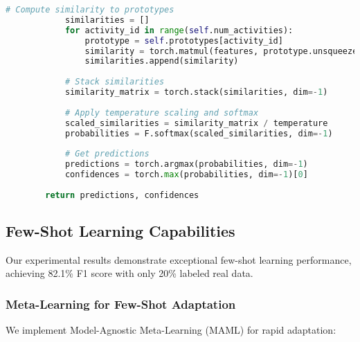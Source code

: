 \documentclass[journal]{IEEEtran}
\begin{document}
\begin{lstlisting}[language=Python, caption=Prototype-Based Zero-Shot Learning]
            # Compute similarity to prototypes
            similarities = []
            for activity_id in range(self.num_activities):
                prototype = self.prototypes[activity_id]
                similarity = torch.matmul(features, prototype.unsqueeze(-1)).squeeze(-1)
                similarities.append(similarity)
            
            # Stack similarities
            similarity_matrix = torch.stack(similarities, dim=-1)
            
            # Apply temperature scaling and softmax
            scaled_similarities = similarity_matrix / temperature
            probabilities = F.softmax(scaled_similarities, dim=-1)
            
            # Get predictions
            predictions = torch.argmax(probabilities, dim=-1)
            confidences = torch.max(probabilities, dim=-1)[0]
        
        return predictions, confidences
\end{lstlisting}

\subsection{Few-Shot Learning Capabilities}

Our experimental results demonstrate exceptional few-shot learning performance, achieving 82.1\% F1 score with only 20\% labeled real data.

\subsubsection{Meta-Learning for Few-Shot Adaptation}

We implement Model-Agnostic Meta-Learning (MAML) for rapid adaptation:
\end{document}
